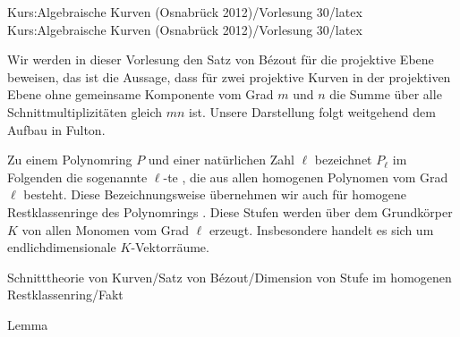 Kurs:Algebraische Kurven (Osnabrück 2012)/Vorlesung 30/latex
Kurs:Algebraische Kurven (Osnabrück 2012)/Vorlesung 30/latex

\setcounter{section}{30}




Wir werden in dieser Vorlesung den Satz von Bézout für die projektive Ebene beweisen, das ist die Aussage, dass für zwei projektive Kurven in der projektiven Ebene ohne gemeinsame Komponente vom Grad $m$ und $n$ die Summe über alle Schnittmultiplizitäten gleich $mn$ ist. Unsere Darstellung folgt weitgehend dem Aufbau in Fulton.


Zu einem Polynomring $P$ und einer natürlichen Zahl $\ell$ bezeichnet $P_\ell$ im Folgenden die sogenannte $\ell$-te  {,} die aus allen homogenen Polynomen vom Grad $\ell$ besteht. Diese Bezeichnungsweise übernehmen wir auch für homogene Restklassenringe des Polynomrings
 {} {.}
Diese Stufen werden über dem Grundkörper $K$ von allen Monomen vom Grad $\ell$ erzeugt. Insbesondere handelt es sich um endlichdimensionale $K$-Vektorräume.



{Schnitttheorie von Kurven/Satz von Bézout/Dimension von Stufe im homogenen Restklassenring/Fakt}

{Lemma}

{}

{


\faktsituation {}



\faktzusatz {}

\faktzusatz {}


}

